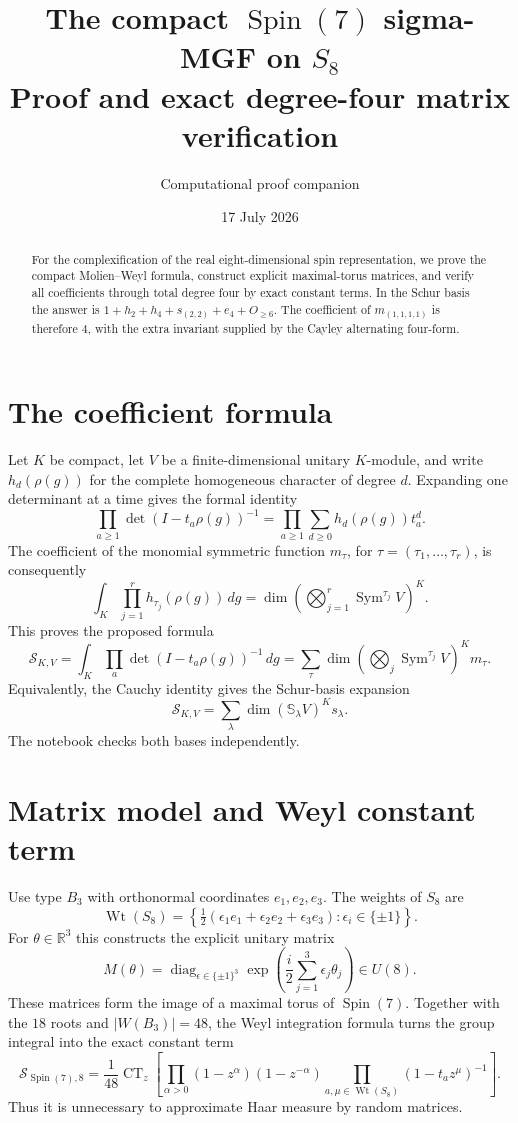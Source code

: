 \documentclass[10pt]{article}
\title{\color{navy}\textbf{The compact $\operatorname{Spin}(7)$ sigma-MGF on $S_8$}\\[1mm]
\large Proof and exact degree-four matrix verification}
\author{Computational proof companion}
\date{17 July 2026}
\newcommand{\Sg}{\mathcal S}
\newcommand{\CT}{\operatorname{CT}}
\begin{document}
\maketitle

\begin{abstract}
For the complexification of the real eight-dimensional spin representation,
we prove the compact Molien--Weyl formula, construct explicit maximal-torus
matrices, and verify all coefficients through total degree four by exact
constant terms.  In the Schur basis the answer is
$1+h_2+h_4+s_{(2,2)}+e_4+O_{\ge6}$.  The coefficient of
$m_{(1,1,1,1)}$ is therefore $4$, with the extra invariant supplied by the
Cayley alternating four-form.
\end{abstract}

\section{The coefficient formula}
Let $K$ be compact, let $V$ be a finite-dimensional unitary $K$-module, and
write $h_d(\rho(g))$ for the complete homogeneous character of degree $d$.
Expanding one determinant at a time gives the formal identity
\[
 \prod_{a\ge1}\det(I-t_a\rho(g))^{-1}
 =\prod_{a\ge1}\sum_{d\ge0}h_d(\rho(g))t_a^d.
\]
The coefficient of the monomial symmetric function $m_\tau$, for
$\tau=(\tau_1,\ldots,\tau_r)$, is consequently
\[
 \int_K\prod_{j=1}^r h_{\tau_j}(\rho(g))\,dg
 =\dim\left(\bigotimes_{j=1}^r\operatorname{Sym}^{\tau_j}V\right)^K.
\]
This proves the proposed formula
\[
 \boxed{\Sg_{K,V}=\int_K\prod_a\det(I-t_a\rho(g))^{-1}\,dg
 =\sum_\tau
 \dim\left(\bigotimes_j\operatorname{Sym}^{\tau_j}V\right)^K m_\tau.}
\]
Equivalently, the Cauchy identity gives the Schur-basis expansion
\[
 \Sg_{K,V}=\sum_\lambda\dim(\mathbb S_\lambda V)^K s_\lambda.
\]
The notebook checks both bases independently.

\section{Matrix model and Weyl constant term}
Use type $B_3$ with orthonormal coordinates $e_1,e_2,e_3$.  The weights of
$S_8$ are
\[
 \operatorname{Wt}(S_8)=
 \left\{\tfrac12(\epsilon_1e_1+\epsilon_2e_2+\epsilon_3e_3):
 \epsilon_i\in\{\pm1\}\right\}.
\]
For $\theta\in\mathbb R^3$ this constructs the explicit unitary matrix
\[
 M(\theta)=\operatorname{diag}_{\epsilon\in\{\pm1\}^3}
 \exp\!\left(\frac{i}{2}\sum_{j=1}^3\epsilon_j\theta_j\right)\in U(8).
\]
These matrices form the image of a maximal torus of $\operatorname{Spin}(7)$.
Together with the $18$ roots and $|W(B_3)|=48$, the Weyl integration formula
turns the group integral into the exact constant term
\[
 \boxed{\Sg_{\operatorname{Spin}(7),8}
 =\frac1{48}\CT_z\left[
 \prod_{\alpha>0}(1-z^\alpha)(1-z^{-\alpha})
 \prod_{a,\mu\in\operatorname{Wt}(S_8)}(1-t_a z^\mu)^{-1}
 \right].}
\]
Thus it is unnecessary to approximate Haar measure by random matrices.
\end{document}
